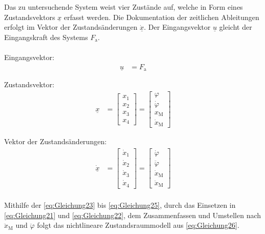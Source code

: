 \documentclass[
	pagesize,
	fontsize=12pt,
	paper=a4,
	oneside,
   reqno
]{scrartcl}
\begin{document}
Das zu untersuchende System weist vier Zustände auf, welche in Form eines Zustandsvektors $\underline{x}$ erfasst werden. Die Dokumentation der zeitlichen Ableitungen erfolgt im Vektor der Zustandsänderungen $\dot{\underline{x}}$. Der Eingangsvektor $\underline{u}$ gleicht der Eingangskraft des Systems $F_{\mathrm{a}}$.
\\\\Eingangsvektor:
\begin{align}\label{eq:Gleichung23}
    \underline{u} &= F_{\mathrm{a}}
\end{align}

Zustandsvektor:
\begin{align}
    \underline{x} &=
    \begin{bmatrix}\label{eq:Gleichung24}
        x_{\mathrm{1}} \\
        x_{\mathrm{2}} \\
        x_{\mathrm{3}} \\
        x_{\mathrm{4}}
    \end{bmatrix} =
    \begin{bmatrix}
        \varphi         \\
        \dot \varphi    \\
        x_{\mathrm{M}}  \\
        \dot x_{\mathrm{M}}
    \end{bmatrix}
\end{align}

Vektor der Zustandsänderungen:
\begin{align}\label{eq:Gleichung25}
    \dot{\underline{x}} &=
    \begin{bmatrix}
        \dot x_{\mathrm{1}} \\
        \dot x_{\mathrm{2}} \\
        \dot x_{\mathrm{3}} \\
        \dot x_{\mathrm{4}}
    \end{bmatrix} =
    \begin{bmatrix}
        \dot{\varphi}           \\
        \ddot{\varphi}          \\
        \dot{x}_{\mathrm{M}}    \\
        \ddot{x}_{\mathrm{M}}
    \end{bmatrix}
\end{align}\\
Mithilfe der \autoref{eq:Gleichung23} bis \autoref{eq:Gleichung25}, durch das Einsetzen in \autoref{eq:Gleichung21} und \autoref{eq:Gleichung22}, dem Zusammenfassen und Umstellen nach $\ddot x_{\mathrm{M}}$ und $\ddot \varphi$ folgt das nichtlineare Zustandsraummodell aus \autoref{eq:Gleichung26}.
\end{document}
